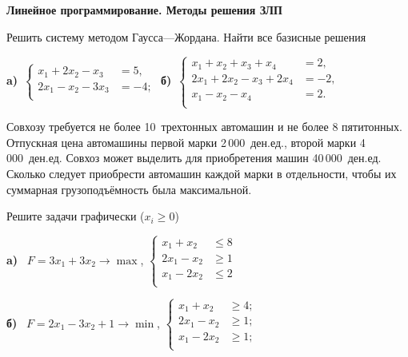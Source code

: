 \documentclass[a5paper,11pt]{extarticle}
\begin{document}
\begin{enumerate}
  {\item[]
          \bfseries Линейное программирование. Методы решения ЗЛП
          \par\vspace{1mm}
  }

\item Решить систему методом Гаусса---Жордана. Найти все базисные решения

\textbf{a)}~$
\left\lbrace
\begin{aligned}
  x_1+2x_2-x_3&=5,\\
  2x_1-x_2-3x_3&=-4;\\
\end{aligned}
\right.
$
\textbf{б)}~$
\left\lbrace
\begin{aligned}
  x_1+x_2+x_3+x_4&=2,\\
  2x_1+2x_2-x_3+2x_4&=-2,\\
  x_1-x_2-x_4&=2.\\
\end{aligned}
\right.
$

\item Совхозу требуется не более 10~трехтонных автомашин и не более 8 пятитонных.
Отпускная цена автомашины первой марки 2\,000~ден.\;ед., второй марки 4\,000~ден.\;ед.
Совхоз может выделить для приобретения машин 40\,000~ден.\;ед. Сколько следует
приобрести автомашин каждой марки в отдельности, чтобы их суммарная
грузоподъёмность была максимальной.

\item Решите задачи графически ($x_{i} \geqslant 0$)

\textbf{a)}~%
$F=3x_{1}+3x_{2} \to \max$,\quad 
$\left\lbrace
  \begin{aligned}
    x_{1}+x_{2} &\leqslant 8\\
    2x_{1}-x_{2} &\geqslant 1\\
    x_{1}-2x_2 &\leqslant 2\\
  \end{aligned} 
  \right.$ 

\textbf{б)}~%
	$F=2x_{1}-3x_{2}+1 \to \min$, \quad
	$ \left\lbrace\begin{aligned}
    	x_{1}+ x_{2} &\geqslant 4;\\
	    2x_{1}- x_{2} &\geqslant 1;\\
	    x_{1}-2x_{2} &\geqslant 1;\\
	  \end{aligned} \right.
	$


\end{enumerate}
\end{document}
